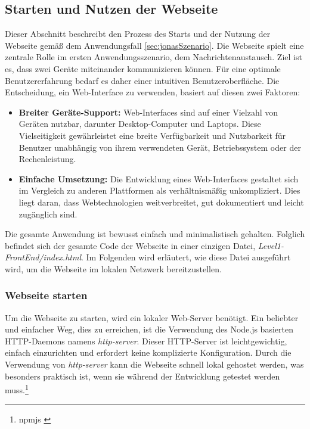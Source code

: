 \subsection{Starten und Nutzen der Webseite}
Dieser Abschnitt beschreibt den Prozess des Starts und der Nutzung der Webseite gemäß dem Anwendungsfall \ref{sec:jonasSzenario}. Die Webseite spielt eine zentrale Rolle im ersten Anwendungsszenario, dem Nachrichtenaustausch. Ziel ist es, dass zwei Geräte miteinander kommunizieren können. Für eine optimale Benutzererfahrung bedarf es daher einer intuitiven Benutzeroberfläche. Die Entscheidung, ein Web-Interface zu verwenden, basiert auf diesen zwei Faktoren:

\begin{itemize}
    \item \textbf{Breiter Geräte-Support:} Web-Interfaces sind auf einer Vielzahl von Geräten nutzbar, darunter Desktop-Computer und Laptops. Diese Vielseitigkeit gewährleistet eine breite Verfügbarkeit und Nutzbarkeit für Benutzer unabhängig von ihrem verwendeten Gerät, Betriebssystem oder der Rechenleistung.

    \item \textbf{Einfache Umsetzung:} Die Entwicklung eines Web-Interfaces gestaltet sich im Vergleich zu anderen Plattformen als verhältnismäßig unkompliziert. Dies liegt daran, dass Webtechnologien weitverbreitet, gut dokumentiert und leicht zugänglich sind.
\end{itemize}

Die gesamte Anwendung ist bewusst einfach und minimalistisch gehalten. Folglich befindet sich der gesamte Code der Webseite in einer einzigen Datei, \textit{Level1-FrontEnd/index.html}. Im Folgenden wird erläutert, wie diese Datei ausgeführt wird, um die Webseite im lokalen Netzwerk bereitzustellen.

\subsubsection{Webseite starten}

Um die Webseite zu starten, wird ein lokaler Web-Server benötigt. Ein beliebter und einfacher Weg, dies zu erreichen, ist die Verwendung des Node.js basierten HTTP-Daemons namens \textit{http-server}. Dieser HTTP-Server ist leichtgewichtig, einfach einzurichten und erfordert keine komplizierte Konfiguration. Durch die Verwendung von \textit{http-server} kann die Webseite schnell lokal gehostet werden, was besonders praktisch ist, wenn sie während der Entwicklung getestet
werden muss.\footnote{npmjs \cite{http-server}}

